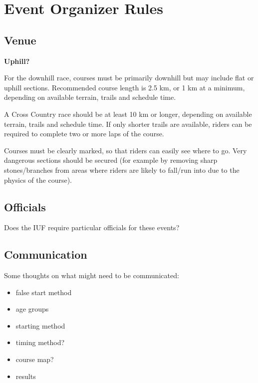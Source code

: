\chapter{Event Organizer Rules}

\section{Venue}

\textbf{Uphill?}

For the downhill race, courses must be primarily downhill but may include flat or uphill sections.
Recommended course length is 2.5 km, or 1 km at a minimum, depending on available terrain, trails and schedule time.

A Cross Country race should be at least 10 km or longer, depending on available terrain, trails and schedule time.
If only shorter trails are available, riders can be required to complete two or more laps of the course.

Courses must be clearly marked, so that riders can easily see where to go.
Very dangerous sections should be secured (for example by removing sharp stones/branches from areas where riders are likely to fall/run into due to the physics of the course).

\section{Officials}

\begin{framed}
Does the IUF require particular officials for these events?
\end{framed}

\section{Communication}

\begin{framed}
Some thoughts on what might need to be communicated:
\begin{itemize}
\item false start method
\item age groups
\item starting method
\item timing method?
\item course map?
\item results
\end{itemize}
\end{framed}


